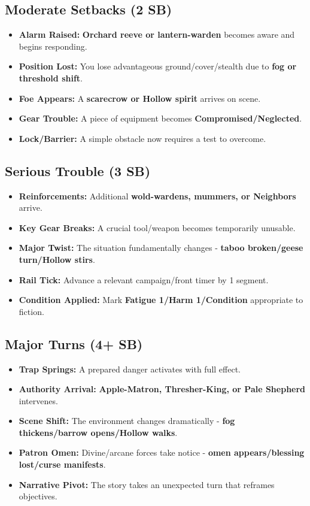 \subsection*{Moderate Setbacks (2 SB)}
\begin{itemize}
\item \textbf{Alarm Raised:} \textbf{Orchard reeve or lantern-warden} becomes aware and begins responding.
\item \textbf{Position Lost:} You lose advantageous ground/cover/stealth due to \textbf{fog or threshold shift}.
\item \textbf{Foe Appears:} A \textbf{scarecrow or Hollow spirit} arrives on scene.
\item \textbf{Gear Trouble:} A piece of equipment becomes \textbf{Compromised/Neglected}.
\item \textbf{Lock/Barrier:} A simple obstacle now requires a test to overcome.
\end{itemize}

\subsection*{Serious Trouble (3 SB)}
\begin{itemize}
\item \textbf{Reinforcements:} Additional \textbf{wold-wardens, mummers, or Neighbors} arrive.
\item \textbf{Key Gear Breaks:} A crucial tool/weapon becomes temporarily unusable.
\item \textbf{Major Twist:} The situation fundamentally changes - \textbf{taboo broken/geese turn/Hollow stirs}.
\item \textbf{Rail Tick:} Advance a relevant campaign/front timer by 1 segment.
\item \textbf{Condition Applied:} Mark \textbf{Fatigue 1/Harm 1/Condition} appropriate to fiction.
\end{itemize}

\subsection*{Major Turns (4+ SB)}
\begin{itemize}
\item \textbf{Trap Springs:} A prepared danger activates with full effect.
\item \textbf{Authority Arrival:} \textbf{Apple-Matron, Thresher-King, or Pale Shepherd} intervenes.
\item \textbf{Scene Shift:} The environment changes dramatically - \textbf{fog thickens/barrow opens/Hollow walks}.
\item \textbf{Patron Omen:} Divine/arcane forces take notice - \textbf{omen appears/blessing lost/curse manifests}.
\item \textbf{Narrative Pivot:} The story takes an unexpected turn that reframes objectives.
\end{itemize}

